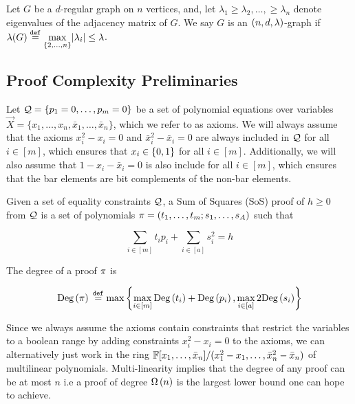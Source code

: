 \documentclass[11pt]{article}
\begin{document}
\begin{definition}\label{def:expander-graphs}
Let $G$ be a $d$-regular graph on $n$ vertices, and, let $\lambda_1 \geq \lambda_2, \dots, \geq \lambda_n$ denote eigenvalues of the adjacency matrix of $G$.
We say $G$ is an $(n, d, \lambda)$-graph if $\lambda(G) \text{}\overset{\mathtt{def}}{=} \underset{{\{2, \dots, n\}}}{\max}|\lambda_i| \leq \lambda$.
\end{definition}


\begin{lemma}\label{lemma:expanders-mixing-lemma}
	
\end{lemma}





\subsection{Proof Complexity Preliminaries}
\label{sec:proof-system-prelims}

Let $\mathcal{Q} = \{ p_1 = 0, \dots, p_m = 0\}$ be a set of polynomial equations over variables $\vec{X} = \{x_1, \dots, x_n, \bar{x}_1, \dots, \bar{x}_n\}$, which we refer to as axioms.
We will always assume that the axioms $x_i^2 - x_i = 0$ and $\bar{x}_i^2 - \bar{x}_i = 0$ are always included in $\mathcal{Q}$ for all $i \in [m]$, which ensures that $x_i \in \{0,1\}$ for all $i\in [m]$.
Additionally, we will also assume that $1 - x_i - \bar{x}_i=0$ is also include for all $i \in [m]$, which ensures that the bar elements are bit complements of the non-bar elements.

\begin{definition}\label{def:sum-of-squares} Given a set of equality constraints $\mathcal{Q}$, a Sum of Squares (SoS) proof of $h \geq 0$ from $\mathcal{Q}$ is a set of polynomials $\pi = (t_1, \dots, t_m; s_1, \dots, s_A)$ such that 

\[ \sum_{i \in [m]} t_ip_i+ \sum_{i \in [a]} s_i^2 = h\]

The degree of a proof $\pi$ is 

\[ \text{Deg}\left(\pi\right) \text{}\overset{\mathtt{def}}{=} \max\left\{\max_{i \in [m]} \text{Deg}\left(t_i\right) + \text{Deg}\left(p_i\right), \max_{i \in [a]} 2\text{Deg}\left(s_i\right)\right\}\]	


\end{definition}

Since we always assume the axioms contain constraints that restrict the variables to a boolean range by adding constraints $x_i^2 - x_i=0$ to the axioms, we can alternatively just work in the ring $\mathbb{F}[x_1, \dots, \bar{x}_n]/(x_1^2 - x_1, \dots, \bar{x}_n^2 - \bar{x}_n)$ of multilinear polynomials.
Multi-linearity implies that the degree of any proof can be at most $n$ i.e a proof of degree $\Omega\left(n\right)$ is the largest lower bound one can hope to achieve.
\end{document}
